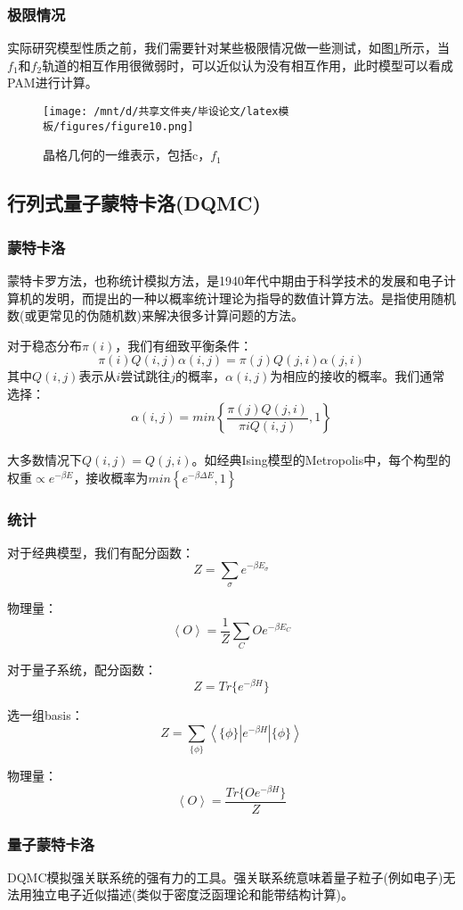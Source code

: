 \subsubsection{极限情况}
实际研究模型性质之前，我们需要针对某些极限情况做一些测试，如图\ref{fig4.1.3}所示，当$f_1$和$f_2$轨道的相互作用很微弱时，可以近似认为没有相互作用，此时模型可以看成PAM进行计算。
\begin{figure}[h]
    \texttt{[image: /mnt/d/共享文件夹/毕设论文/latex模板/figures/figure10.png]}
    \caption{晶格几何的一维表示，包括c，$f_1$}
    \label{fig4.1.3}
\end{figure}

\subsection{行列式量子蒙特卡洛(DQMC)}%
\subsubsection{蒙特卡洛}
蒙特卡罗方法，也称统计模拟方法，是1940年代中期由于科学技术的发展和电子计算机的发明，而提出的一种以概率统计理论为指导的数值计算方法。是指使用随机数(或更常见的伪随机数)来解决很多计算问题的方法。

对于稳态分布$\pi(i)$，我们有细致平衡条件：
$$
\pi(i)Q(i,j)\alpha(i,j)=\pi(j)Q(j,i)\alpha(j,i)
$$
其中$Q(i,j)$表示从$i$尝试跳往$j$的概率，$\alpha(i,j)$为相应的接收的概率。我们通常选择：
$$
\alpha(i,j)=min\left \{\frac{\pi(j)Q(j,i)}{\pi{i}Q(i,j)},1\right \}
$$
\\大多数情况下$Q(i,j)=Q(j,i)$。如经典Ising模型的Metropolis中，每个构型的权重$\propto e^{-\beta E}$，接收概率为$min \left \{ e^{-\beta \Delta E},1 \right \}$
\subsubsection{统计}
对于经典模型，我们有配分函数：
$$
Z=\sum_\sigma e^{-\beta E_\sigma}
$$

物理量：
$$
\left \langle O \right \rangle=\frac{1}{Z} \sum_C O e^{-\beta E_C}
$$

对于量子系统，配分函数：
$$
Z=Tr\{e^{-\beta H}\}
$$

选一组basis：
$$
Z=\sum_{\{\phi \}} \left \langle \{\phi \} | e^{-\beta H}| \{\phi \} \right \rangle
$$

物理量：
$$
\left \langle O \right \rangle=\frac{Tr\{ O e^{-\beta H} \}}{Z}
$$


\subsubsection{量子蒙特卡洛}
DQMC模拟强关联系统的强有力的工具。强关联系统意味着量子粒子(例如电子)无法用独立电子近似描述(类似于密度泛函理论和能带结构计算)。

